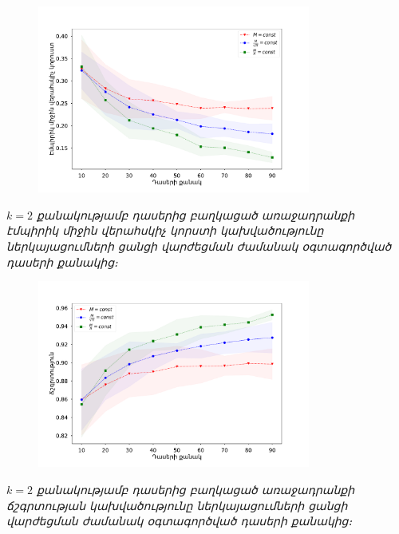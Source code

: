 \documentclass[10pt]{beamer}
\begin{document}
\begin{frame}
\begin{figure}[htp]
\centering
\includegraphics[width=0.8\textwidth]{imgs/k=2.pdf}
\end{figure}
\begin{center}
 \fontsize{7pt}{7pt} 
\armfont \textit{$k=2$ քանակությամբ դասերից բաղկացած առաջադրանքի էմպիրիկ միջին վերահսկիչ կորստի կախվածությունը ներկայացումների ցանցի վարժեցման ժամանակ  օգտագործված դասերի քանակից։}
\end{center}
\end{frame}

\begin{frame}
\begin{figure}[htp]
\centering
\includegraphics[width=0.8\textwidth]{imgs/k=2_acc.pdf}
\end{figure}
\begin{center}
 \fontsize{7pt}{7pt} 
\armfont \textit{$k=2$ քանակությամբ դասերից բաղկացած առաջադրանքի ճշգրտության կախվածությունը ներկայացումների ցանցի վարժեցման ժամանակ  օգտագործված դասերի քանակից։}
\end{center}
\end{frame}
\end{document}
